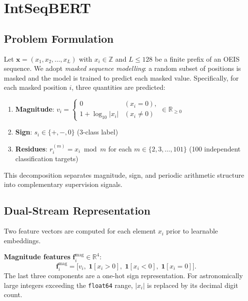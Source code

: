
\section{IntSeqBERT}
\label{sec:model}

\subsection{Problem Formulation}
\label{sec:formulation}

Let $\mathbf{x} = (x_1, x_2, \ldots, x_L)$ with $x_i \in \mathbb{Z}$ and $L \leq 128$ be a
finite prefix of an OEIS sequence. We adopt \emph{masked sequence modelling}: a random subset
of positions is masked and the model is trained to predict each masked value. Specifically, for
each masked position $i$, three quantities are predicted:
\begin{enumerate}
  \item \textbf{Magnitude}: $v_i =
    \begin{cases} 0 & (x_i = 0),\\ 1 + \log_{10}|x_i| & (x_i \neq 0) \end{cases} \in \mathbb{R}_{\geq 0}$
  \item \textbf{Sign}: $s_i \in \{+, -, 0\}$ (3-class label)
  \item \textbf{Residues}: $r_i^{(m)} = x_i \bmod m$ for each $m \in \{2, 3, \ldots, 101\}$
        (100 independent classification targets)
\end{enumerate}
This decomposition separates magnitude, sign, and periodic arithmetic structure into
complementary supervision signals.

\subsection{Dual-Stream Representation}
\label{sec:dualstream}

Two feature vectors are computed for each element $x_i$ prior to learnable embeddings.

\textbf{Magnitude features} $\mathbf{f}_i^{\text{mag}} \in \mathbb{R}^4$:
\[
  \mathbf{f}_i^{\text{mag}} = \bigl[v_i,\;\mathbf{1}[x_i > 0],\;\mathbf{1}[x_i < 0],\;\mathbf{1}[x_i = 0]\bigr].
\]
The last three components are a one-hot sign representation. For astronomically large integers
exceeding the \texttt{float64} range, $|x_i|$ is replaced by its decimal digit count.

